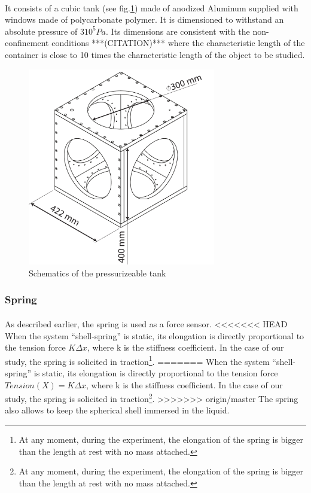 \paragraph{}
It consists of a cubic tank (see fig.\ref{fig:tank}) made of anodized Aluminum supplied with windows made of polycarbonate polymer. It is dimensioned to withstand an absolute pressure of $3 10^5 Pa$. Its dimensions are consistent with the non-confinement conditions ***(CITATION)*** where the characteristic length of the container is close to 10 times the characteristic length of the object to be studied.
\begin{figure}[H] %
	\centering%
  \includegraphics[width=0.73\textwidth]{figures/Chapter_1/cuve.pdf}
	\caption{Schematics of the pressurizeable tank}
	\label{fig:tank}
\end{figure}
\subsubsection{Spring}
\paragraph{}
As described earlier, the spring is used as a force sensor. 
<<<<<<< HEAD
When the system "`shell-spring"' is static, its elongation is directly proportional to the tension force $K \Delta x$, where k is the stiffness coefficient. In the case of our study, the spring is solicited in traction\footnote{At any moment, during the experiment, the elongation of the spring is bigger than the length at rest with no mass attached.}. 
=======
When the system "`shell-spring"' is static, its elongation is directly proportional to the tension force $Tension(X) = K \Delta x$, where k is the stiffness coefficient. In the case of our study, the spring is solicited in traction\footnote{At any moment, during the experiment, the elongation of the spring is bigger than the length at rest with no mass attached.}. 
>>>>>>> origin/master
The spring also allows to keep the spherical shell immersed in the liquid.
